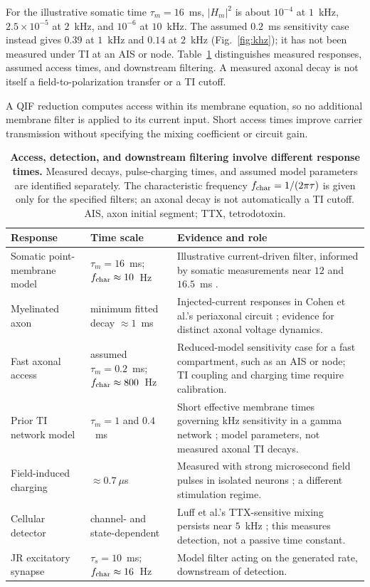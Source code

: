\documentclass[11pt,a4paper]{article}
\begin{document}
For the illustrative somatic time $\tau_m=16$~ms, $|H_m|^2$ is about
$10^{-4}$ at $1$~kHz, $2.5\times10^{-5}$ at $2$~kHz, and $10^{-6}$ at
$10$~kHz. The assumed $0.2$~ms sensitivity case instead gives $0.39$ at
$1$~kHz and $0.14$ at $2$~kHz (Fig.~\ref{fig:khz}); it has not been measured
under TI at an AIS or node. Table~\ref{tab:doors} distinguishes measured
responses, assumed access times, and downstream filtering. A measured axonal
decay is not itself a field-to-polarization transfer or a TI cutoff.

A QIF reduction computes access within its membrane equation, so no additional
membrane filter is applied to its current input. Short access times improve
carrier transmission without specifying the mixing coefficient or circuit gain.

\begin{table}[h]
\centering\small
\renewcommand{\arraystretch}{1.15}
\begin{tabular}{@{}>{\raggedright\arraybackslash}p{2.8cm}
>{\raggedright\arraybackslash}p{3.5cm}
>{\raggedright\arraybackslash}p{8.6cm}@{}}
\toprule
Response & Time scale & Evidence and role \\
\midrule
Somatic point-membrane model & $\tau_m=16$~ms; $f_{\rm char}\approx10$~Hz &
Illustrative current-driven filter, informed by somatic measurements near $12$ and $16.5$~ms
\cite{deitcher2017,eyal2016}. \\
Myelinated axon & minimum fitted decay $\approx1$~ms &
Injected-current responses in Cohen et al.'s periaxonal circuit
\cite{cohen2020periaxonal}; evidence for distinct axonal voltage dynamics. \\
Fast axonal access & assumed $\tau_m=0.2$~ms; $f_{\rm char}\approx800$~Hz &
Reduced-model sensitivity case for a fast compartment, such as an AIS or node;
TI coupling and charging time require calibration. \\
Prior TI network model & $\tau_m=1$ and $0.4$~ms &
Short effective membrane times governing kHz sensitivity in a gamma network
\cite{esmaeilpour2021}; model parameters, not measured axonal TI decays. \\
Field-induced charging & $\approx0.7~\mu$s &
Measured with strong microsecond field pulses in isolated neurons
\cite{semenov2025}; a different stimulation regime. \\
Cellular detector & channel- and state-dependent &
Luff et al.'s TTX-sensitive mixing persists near $5$~kHz
\cite{luff2024mixer}; this measures detection, not a passive time constant. \\
JR excitatory synapse & $\tau_s=10$~ms; $f_{\rm char}\approx16$~Hz &
Model filter acting on the generated rate, downstream of detection. \\
\bottomrule
\end{tabular}
\caption{\textbf{Access, detection, and downstream filtering involve different response
times.} Measured decays, pulse-charging times, and assumed model parameters are
identified separately. The characteristic frequency $f_{\rm char}=1/(2\pi\tau)$
is given only for the specified filters; an axonal decay is not automatically a TI
cutoff. AIS, axon initial segment; TTX, tetrodotoxin.}
\label{tab:doors}
\end{table}
\end{document}
